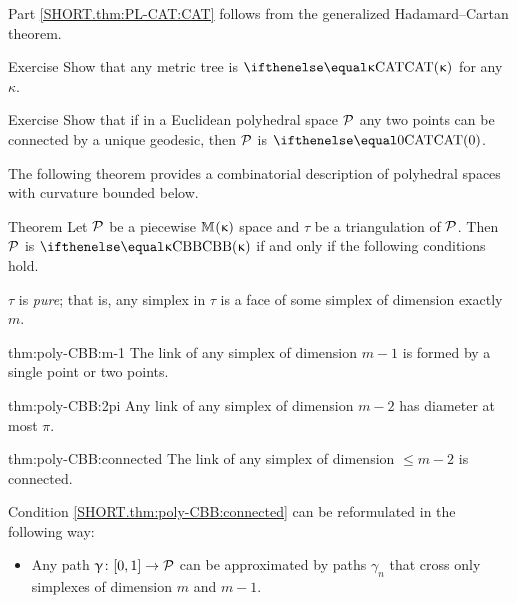 Part \ref{SHORT.thm:PL-CAT:CAT} follows from the generalized Hadamard--Cartan theorem.
\qeds

\begin{thm}{Exercise}\label{ex:metric tree}
Show that any metric tree is $\CAT\kappa$ for any $\kappa$.
\end{thm}


\begin{thm}{Exercise}\label{ex:poly-unique-geodesic}
Show that if in a Euclidean polyhedral space $\mathcal{P}$
any two points can be connected by a unique geodesic,  
then $\mathcal{P}$ is $\CAT0$.
\end{thm}

The following theorem provides a combinatorial description of polyhedral spaces with curvature bounded below.

\begin{thm}{Theorem}\label{thm:poly-CBB} Let $\mathcal{P}$ be a piecewise
$\mathbb{M}_{{}}^{}({\upkappa})$ space and $\tau$ be a triangulation of $\mathcal{P}$.
Then $\mathcal{P}$ is $\Alex\kappa$ if and only if the following conditions hold.

\begin{subthm}{} $\tau$ is \emph{pure}; 
that is, any simplex in $\tau$ is  a face of some simplex of dimension exactly $m$. 
\end{subthm}

\begin{subthm}{thm:poly-CBB:m-1}
The link of any simplex of dimension $m-1$ is formed by a single point or two points.
\end{subthm}

\begin{subthm}{thm:poly-CBB:2pi}
Any link of any simplex of dimension $m-2$
has diameter at most $\pi$.
\end{subthm}

\begin{subthm}{thm:poly-CBB:connected}
The link of any simplex of dimension $\le m-2$ is connected.
\end{subthm}

\end{thm}

Condition \ref{SHORT.thm:poly-CBB:connected}
can be reformulated in the following way:

\begin{itemize}
 \item[\ref{SHORT.thm:poly-CBB:connected}$\,'\!$] 
Any path $\gamma\:[0,1]\to \spc{P}$ can be approximated by paths
$\gamma_n$ 
that cross only simplexes of dimension $m$ and $m-1$.
\end{itemize}

